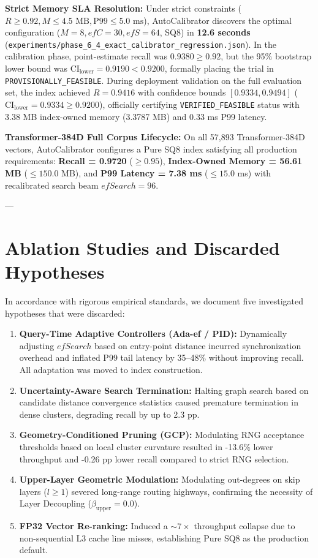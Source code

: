 \documentclass[10pt,journal,compsoc]{IEEEtran}
\begin{document}
\textbf{Strict Memory SLA Resolution:} Under strict constraints ($R \ge 0.92, M \le 4.5\text{ MB}, \text{P99} \le 5.0\text{ ms}$), AutoCalibrator discovers the optimal configuration ($M=8, efC=30, efS=64$, SQ8) in \textbf{12.6 seconds} (\texttt{experiments/phase\_6\_4\_exact\_calibrator\_regression.json}). In the calibration phase, point-estimate recall was $0.9380 \ge 0.92$, but the 95\% bootstrap lower bound was $\text{CI}_{\text{lower}} = 0.9190 < 0.9200$, formally placing the trial in \texttt{PROVISIONALLY\_FEASIBLE}. During deployment validation on the full evaluation set, the index achieved $R=0.9416$ with confidence bounds $[0.9334, 0.9494]$ ($\text{CI}_{\text{lower}} = 0.9334 \ge 0.9200$), officially certifying \texttt{VERIFIED\_FEASIBLE} status with 3.38 MB index-owned memory (3.3787 MB) and 0.33 ms P99 latency.

\textbf{Transformer-384D Full Corpus Lifecycle:} On all 57,893 Transformer-384D vectors, AutoCalibrator configures a Pure SQ8 index satisfying all production requirements: \textbf{Recall = 0.9720} ($\ge 0.95$), \textbf{Index-Owned Memory = 56.61 MB} ($\le 150.0$ MB), and \textbf{P99 Latency = 7.38 ms} ($\le 15.0$ ms) with recalibrated search beam $efSearch=96$.

---

\section{Ablation Studies and Discarded Hypotheses}
\label{sec:ablations}

In accordance with rigorous empirical standards, we document five investigated hypotheses that were discarded:
\begin{enumerate}
    \item \textbf{Query-Time Adaptive Controllers (Ada-ef / PID):} Dynamically adjusting $efSearch$ based on entry-point distance incurred synchronization overhead and inflated P99 tail latency by 35–48\% without improving recall. All adaptation was moved to index construction.
    \item \textbf{Uncertainty-Aware Search Termination:} Halting graph search based on candidate distance convergence statistics caused premature termination in dense clusters, degrading recall by up to 2.3 pp.
    \item \textbf{Geometry-Conditioned Pruning (GCP):} Modulating RNG acceptance thresholds based on local cluster curvature resulted in -13.6\% lower throughput and -0.26 pp lower recall compared to strict RNG selection.
    \item \textbf{Upper-Layer Geometric Modulation:} Modulating out-degrees on skip layers ($l \ge 1$) severed long-range routing highways, confirming the necessity of Layer Decoupling ($\beta_{\text{upper}} = 0.0$).
    \item \textbf{FP32 Vector Re-ranking:} Induced a $\sim 7\times$ throughput collapse due to non-sequential L3 cache line misses, establishing Pure SQ8 as the production default.
\end{enumerate}
\end{document}
